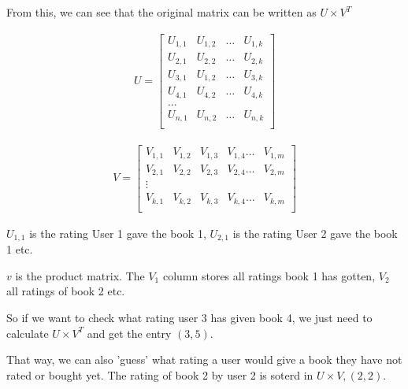 \documentclass[11pt]{article}
\begin{document}
From this, we can see that the original matrix can be written as $U \times V^T$

\begin{minipage}{0.45\textwidth}
    \begin{align*}
        U =
        \begin{bmatrix}
            U_{1,1} & U_{1,2} & \hdots & U_{1,k} \\
            U_{2,1} & U_{2,2} & \hdots & U_{2,k} \\
            U_{3,1} & U_{1,2} & \hdots & U_{3,k} \\
            U_{4,1} & U_{4,2} & \hdots & U_{4,k} \\
            \hdots                               \\
            U_{n,1} & U_{n,2} & \hdots & U_{n,k} \\
        \end{bmatrix}
    \end{align*}
\end{minipage} \hfill
\begin{minipage}{0.45\textwidth}
    \begin{align*}
        V =
        \begin{bmatrix}
            V_{1,1} & V_{1,2} & V_{1,3} & V_{1,4} \hdots & V_{1,m} \\
            V_{2,1} & V_{2,2} & V_{2,3} & V_{2,4} \hdots & V_{2,m} \\
            \vdots                                                 \\
            V_{k,1} & V_{k,2} & V_{k,3} & V_{k,4} \hdots & V_{k,m} \\
        \end{bmatrix}
    \end{align*}
\end{minipage}

\vspace{10px}

$U_{1,1}$ is the rating User 1 gave the book 1,  $U_{2,1}$ is the rating User 2 gave the book 1 etc.

$v$ is the product matrix. The $V_1$ column stores all ratings book 1 has gotten, $V_2$ all ratings of book 2 etc.

\vspace{10px}

So if we want to check what rating user 3 has given book 4, we just need to calculate $U \times V^T$ and get the entry $(3,5)$.

That way, we can also 'guess' what rating a user would give a book they have not rated or bought yet. The rating of book 2 by user 2 is soterd in $U \times V, (2,2)$.
\end{document}
